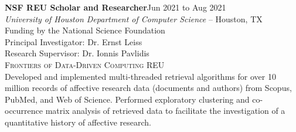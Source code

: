 \documentclass[hidelinks, 10pt]{article}
\begin{document}
{{    \begin{minipage}[ct]{0.9\linewidth}
        \textbf{NSF REU Scholar and Researcher}\hfill Jun 2021 to Aug 2021\\
        \emph{University of Houston Department of Computer Science} -- Houston, TX\\
        Funding by the National Science Foundation\\
        Principal Investigator: Dr. Ernst Leiss\\
        Research Supervisor: Dr. Ionnis Pavlidis\\
        {\textsc{Frontiers of Data-Driven Computing REU}}
        \vspace{1mm}\\
        Developed and implemented multi-threaded retrieval algorithms for over 10 million records of affective research data (documents and
        authors) from Scopus, PubMed, and Web of Science. Performed exploratory clustering and co-occurrence matrix analysis of retrieved
        data to facilitate the investigation of a quantitative history of affective research.
    \end{minipage}

    \vspace{7mm}

}}
\end{document}

